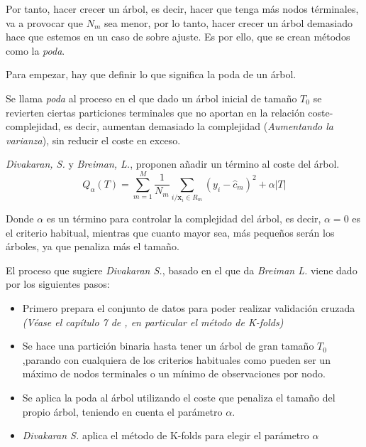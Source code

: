 \noindent Por tanto, hacer crecer un árbol, es decir, hacer que tenga más nodos términales, va a provocar que $N_m$ sea menor, por lo tanto, hacer crecer un árbol demasiado hace que estemos en un caso de sobre ajuste. Es por ello, que se crean métodos como la \emph{poda}.

\noindent Para empezar, hay que definir lo que significa la poda de un árbol. 
\begin{defi}
Se llama \emph{poda} al proceso en el que dado un árbol inicial de tamaño $T_0$ se revierten ciertas particiones terminales que no aportan en la relación coste-complejidad, es decir, aumentan demasiado la complejidad (\emph{Aumentando la varianza}), sin reducir el coste en exceso. 
\end{defi}


\noindent \emph{Divakaran, S. }\cite{Divakaran 2022} y \emph{Breiman, L.}\cite{Breiman 1984}, proponen añadir un término al coste del árbol. 
\begin{equation}
Q_{\alpha}(T)=\sum_{m=1}^M\frac{1}{N_m}\sum_{i/\mathbf{x}_i\in R_m} (y_i-\hat{c}_m)^2+\alpha|T |
\end{equation}

\noindent Donde $\alpha$ es un término para controlar la complejidad del árbol, es decir, $\alpha=0$ es el criterio habitual, mientras que cuanto mayor sea, más pequeños serán los árboles, ya que penaliza más el tamaño.  

\noindent El proceso que sugiere \emph{Divakaran S.}\cite{Divakaran 2022}, basado en el que da \emph{Breiman L.}\cite{Breiman 1984} viene dado por los siguientes pasos:
\begin{itemize}
\item Primero prepara el conjunto de datos para poder realizar validación cruzada \emph{(Véase el capítulo 7 de \cite{Hastie 2001}, en particular el método de K-folds)}
\item Se hace una partición binaria hasta tener un árbol de gran tamaño $T_0$,parando con cualquiera de los criterios habituales como pueden ser un máximo de nodos terminales o un mínimo de observaciones por nodo. 

\item Se aplica la poda al árbol utilizando el coste que penaliza el tamaño del propio árbol, teniendo en cuenta el parámetro $\alpha$. 

\item \emph{Divakaran S.}\cite{Divakaran 2022} aplica el método de K-folds para elegir el parámetro $\alpha$
\end{itemize}

